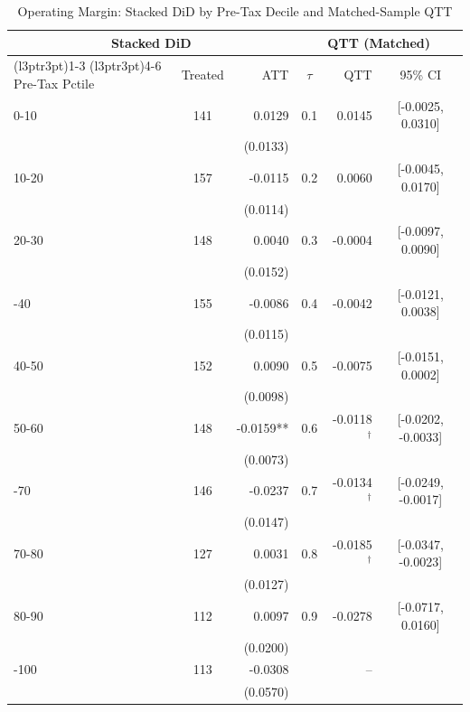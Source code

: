 \begin{table}[!h]
\centering
\caption{Operating Margin: Stacked DiD by Pre-Tax Decile and Matched-Sample QTT}
\centering
\begin{tabular}[t]{lcrcrc}
\toprule
\multicolumn{3}{c}{Stacked DiD} & \multicolumn{3}{c}{QTT (Matched)} \\
\cmidrule(l{3pt}r{3pt}){1-3} \cmidrule(l{3pt}r{3pt}){4-6}
Pre-Tax Pctile & Treated & ATT & $\tau$ & QTT & 95\% CI\\
\midrule
0-10 & 141 & 0.0129 & 0.1 & 0.0145 & {}[-0.0025, 0.0310]\\
 &  & (0.0133) &  &  & \\
10-20 & 157 & -0.0115 & 0.2 & 0.0060 & {}[-0.0045, 0.0170]\\
 &  & (0.0114) &  &  & \\
20-30 & 148 & 0.0040 & 0.3 & -0.0004 & {}[-0.0097, 0.0090]\\
 &  & (0.0152) &  &  & \\
\addlinespace
30-40 & 155 & -0.0086 & 0.4 & -0.0042 & {}[-0.0121, 0.0038]\\
 &  & (0.0115) &  &  & \\
40-50 & 152 & 0.0090 & 0.5 & -0.0075 & {}[-0.0151, 0.0002]\\
 &  & (0.0098) &  &  & \\
50-60 & 148 & -0.0159** & 0.6 & -0.0118$^{\dagger}$ & {}[-0.0202, -0.0033]\\
 &  & (0.0073) &  &  & \\
\addlinespace
60-70 & 146 & -0.0237 & 0.7 & -0.0134$^{\dagger}$ & {}[-0.0249, -0.0017]\\
 &  & (0.0147) &  &  & \\
70-80 & 127 & 0.0031 & 0.8 & -0.0185$^{\dagger}$ & {}[-0.0347, -0.0023]\\
 &  & (0.0127) &  &  & \\
80-90 & 112 & 0.0097 & 0.9 & -0.0278 & {}[-0.0717, 0.0160]\\
 &  & (0.0200) &  &  & \\
\addlinespace
90-100 & 113 & -0.0308 & & -- & \\
 &  & (0.0570) &  &  & \\
\bottomrule


\end{tabular}
\end{table}
